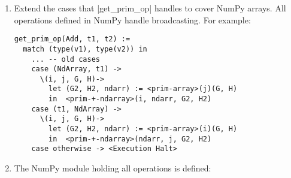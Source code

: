 \begin{enumerate}
  Note: The values stored inside a NumPy array are consider irrelevant
  in this work. The Value Analysis built in this work considers only the
  shape of tensors, as tensors can be huge and their contents do not
  often influence their shape. Therefore, it would be wasteful to give a
  detailed formalisation of the NumPy library primitives.

  Nonetheless, defining formaly each one of the NumPy functions above is
  fairly straightforward. Although, the hardest part of a formal
  defitinion of Numpy arrays is detailing how \pycode|array| works. To
  define the function \pycode|<np-array>| one
  must consider the many input cases it can handle, and it can handle
  almost any Python object\footnote{The NumPy function \pycode|array|
    takes almost anything as an input. \pycode|arrays| tries to
    interpret its input as an array in any way it can. There is no
    formal definition of how the values are interpreted althought its
    semantics can be extracted by looking at its C implementation:
    https://stackoverflow.com/a/40380014}.

  Once the \pycode|<np-array>| function is
  implemented all other functions are much simpler to define. As an
  example, the implementation of the function \pycode|size| is:

\begin{verbatim}
<prim-np-size>(val)(G, H) :=
   -- We know that `<prim-array>` always returns an NdArray
   let (G, H, (NdArray, addr, arr)) := <prim-array>(val)(G, H)
   -- We know that a NdArray has a special value called `shape`
       (Tuple, addrtup, tup) := arr('shape')
   in  tup('size')
\end{verbatim}
\item
  Extend the cases that \pycode|get_prim_op| handles to cover NumPy
  arrays. All operations defined in NumPy handle broadcasting.
  {} For example:

\begin{verbatim}
get_prim_op(Add, t1, t2) :=
  match (type(v1), type(v2)) in
    ... -- old cases
    case (NdArray, t1) ->
      \(i, j, G, H)->
        let (G2, H2, ndarr) := <prim-array>(j)(G, H)
        in  <prim-+-ndarray>(i, ndarr, G2, H2)
    case (t1, NdArray) ->
      \(i, j, G, H)->
        let (G2, H2, ndarr) := <prim-array>(i)(G, H)
        in  <prim-+-ndarray>(ndarr, j, G2, H2)
    case otherwise -> <Execution Halt>
\end{verbatim}
\item
  The NumPy module holding all operations is defined:


\end{enumerate}
